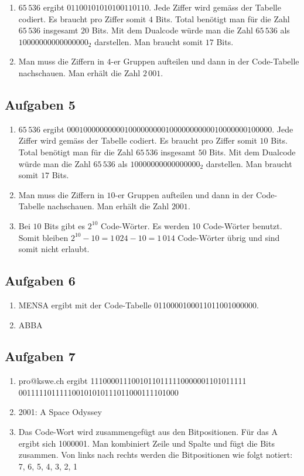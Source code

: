 \begin{enumerate}
\item $65\,536$ ergibt $01100101010100110110$. Jede Ziffer wird gemäss der Tabelle codiert. Es braucht pro Ziffer somit $4$ Bits. Total benötigt man für die Zahl $65\,536$ insgesamt $20$ Bits. Mit dem Dualcode würde man die Zahl $65\,536$ als $10000000000000000_2$ darstellen. Man braucht somit $17$ Bits.
\item Man muss die Ziffern in $4$-er Gruppen aufteilen und dann in der Code-Tabelle nachschauen. Man erhält die Zahl $2\,001$.
\end{enumerate}

\subsection*{Aufgaben 5}

\begin{enumerate}
\item $65\,536$ ergibt $00010000000000100000000010000000000010000000100000$. Jede Ziffer wird gemäss der Tabelle codiert. Es braucht pro Ziffer somit $10$ Bits. Total benötigt man für die Zahl $65\,536$ insgesamt $50$ Bits. Mit dem Dualcode würde man die Zahl $65\,536$ als $10000000000000000_2$ darstellen. Man braucht somit $17$ Bits.
\item Man muss die Ziffern in $10$-er Gruppen aufteilen und dann in der Code-Tabelle nachschauen. Man erhält die Zahl $2001$.
\item Bei $10$ Bits gibt es $2^{10}$ Code-Wörter. Es werden  10 Code-Wörter benutzt. Somit bleiben $2^{10} - 10 = 1\,024 - 10 = 1\,014$ Code-Wörter übrig und sind somit nicht erlaubt.
\end{enumerate}

\subsection*{Aufgaben 6}

\begin{enumerate}
\item MENSA ergibt mit der Code-Tabelle 0110000100011011001000000.
\item ABBA
\end{enumerate}

\subsection*{Aufgaben 7}

\begin{enumerate}
\item pro@kswe.ch ergibt 11100001110010110111110000001101011111\\
001111101111100101010111011000111101000
\item 2001: A Space Odyssey
\item Das Code-Wort wird zusammengefügt aus den Bitpositionen. Für das A ergibt sich 1000001. Man kombiniert Zeile und Spalte und fügt die Bits zusammen. Von links nach rechts werden die Bitpositionen wie folgt notiert: 7, 6, 5, 4, 3, 2, 1
\end{enumerate}